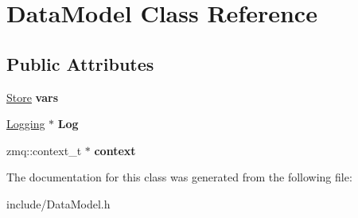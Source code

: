 \hypertarget{classDataModel}{\section{Data\-Model Class Reference}
\label{classDataModel}
}
\subsection*{Public Attributes}
\begin{DoxyCompactItemize}
\item 
\hypertarget{classDataModel_a4baac5fe364a7a23762d70d2c2216486}{\hyperlink{classStore}{Store} {\bfseries vars}}\label{classDataModel_a4baac5fe364a7a23762d70d2c2216486}

\item 
\hypertarget{classDataModel_aa777da4c632e4659ee5b1447ad513458}{\hyperlink{classLogging}{Logging} $\ast$ {\bfseries Log}}\label{classDataModel_aa777da4c632e4659ee5b1447ad513458}

\item 
\hypertarget{classDataModel_a2c6dfd692e50f90e55338970ea7f8d61}{zmq\-::context\-\_\-t $\ast$ {\bfseries context}}\label{classDataModel_a2c6dfd692e50f90e55338970ea7f8d61}

\end{DoxyCompactItemize}


The documentation for this class was generated from the following file\-:\begin{DoxyCompactItemize}
\item 
include/Data\-Model.\-h\end{DoxyCompactItemize}
